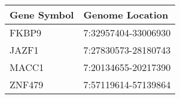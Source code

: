 \begin{tabular}{ll}
\toprule
Gene Symbol &     Genome Location \\
\midrule
      FKBP9 & 7:32957404-33006930 \\
      JAZF1 & 7:27830573-28180743 \\
      MACC1 & 7:20134655-20217390 \\
     ZNF479 & 7:57119614-57139864 \\
\bottomrule
\end{tabular}
